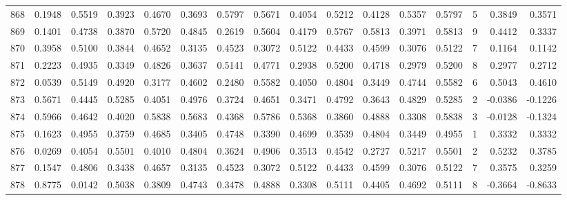 \begin{tabular}{lrrrrrrrrrrrrrrr}
868 &      0.1948 &  0.5519 &  0.3923 &  0.4670 &  0.3693 &  0.5797 &  0.5671 &  0.4054 &  0.5212 &  0.4128 &   0.5357 &     0.5797 &      5 &                    0.3849 &                     0.3571 \\
869 &      0.1401 &  0.4738 &  0.3870 &  0.5720 &  0.4845 &  0.2619 &  0.5604 &  0.4179 &  0.5767 &  0.5813 &   0.3971 &     0.5813 &      9 &                    0.4412 &                     0.3337 \\
870 &      0.3958 &  0.5100 &  0.3844 &  0.4652 &  0.3135 &  0.4523 &  0.3072 &  0.5122 &  0.4433 &  0.4599 &   0.3076 &     0.5122 &      7 &                    0.1164 &                     0.1142 \\
871 &      0.2223 &  0.4935 &  0.3349 &  0.4826 &  0.3637 &  0.5141 &  0.4771 &  0.2938 &  0.5200 &  0.4718 &   0.2979 &     0.5200 &      8 &                    0.2977 &                     0.2712 \\
872 &      0.0539 &  0.5149 &  0.4920 &  0.3177 &  0.4602 &  0.2480 &  0.5582 &  0.4050 &  0.4804 &  0.3449 &   0.4744 &     0.5582 &      6 &                    0.5043 &                     0.4610 \\
873 &      0.5671 &  0.4445 &  0.5285 &  0.4051 &  0.4976 &  0.3724 &  0.4651 &  0.3471 &  0.4792 &  0.3643 &   0.4829 &     0.5285 &      2 &                   -0.0386 &                    -0.1226 \\
874 &      0.5966 &  0.4642 &  0.4020 &  0.5838 &  0.5683 &  0.4368 &  0.5786 &  0.5368 &  0.3860 &  0.4888 &   0.3308 &     0.5838 &      3 &                   -0.0128 &                    -0.1324 \\
875 &      0.1623 &  0.4955 &  0.3759 &  0.4685 &  0.3405 &  0.4748 &  0.3390 &  0.4699 &  0.3539 &  0.4804 &   0.3449 &     0.4955 &      1 &                    0.3332 &                     0.3332 \\
876 &      0.0269 &  0.4054 &  0.5501 &  0.4010 &  0.4804 &  0.3624 &  0.4906 &  0.3513 &  0.4542 &  0.2727 &   0.5217 &     0.5501 &      2 &                    0.5232 &                     0.3785 \\
877 &      0.1547 &  0.4806 &  0.3438 &  0.4657 &  0.3135 &  0.4523 &  0.3072 &  0.5122 &  0.4433 &  0.4599 &   0.3076 &     0.5122 &      7 &                    0.3575 &                     0.3259 \\
878 &      0.8775 &  0.0142 &  0.5038 &  0.3809 &  0.4743 &  0.3478 &  0.4888 &  0.3308 &  0.5111 &  0.4405 &   0.4692 &     0.5111 &      8 &                   -0.3664 &                    -0.8633 \\

\end{tabular}
